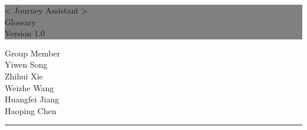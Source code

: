 \documentclass[10pt]{article}
\begin{document}

\begin{titlepage} %
	
	
	\colorbox{grey}{
		\parbox[t]{1.1\textwidth}{ %
			\parbox[t]{1.02\textwidth}{ %
				\raggedleft %
				\fontsize{34pt}{40pt}\selectfont %
				\vspace{0.7cm} %
				
				< Journey Assistant >\\
                Glossary\\
                Version 1.0\\
				
				\vspace{0.7cm} %
			}
		}
	}
	
	\vfill %
	
	
	\parbox[t]{1\textwidth}{ %
		\raggedleft %
		\large %
		{\Large Group Member}\\[4pt] %
        Yiwen Song\\
        Zhihui Xie\\
        Weizhe Wang\\
        Huangfei Jiang\\
        Haoping Chen\\
		
		\hfill\rule{0.2\linewidth}{1pt}%
    }
    
	
\end{titlepage}
\end{document}
